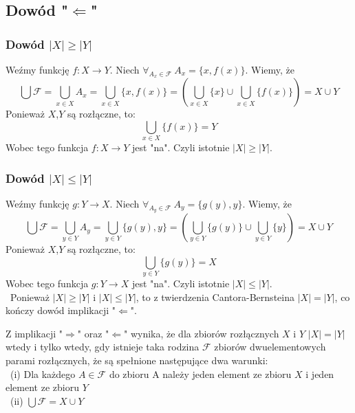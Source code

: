 \documentclass{article}
\begin{document}
\subsection*{Dowód "$\Leftarrow$"}
\subsubsection*{Dowód $|X|\geq |Y|$}
Weźmy funkcję $f: X \rightarrow Y$. Niech $\forall_{A_x \in \mathcal{F}} \ A_x = \{x,f(x)\}$. Wiemy, że \[\bigcup \mathcal{F} = \bigcup_{x \in X} A_x = \bigcup_{x\in X} \{x,f(x)\} =  (\bigcup_{x\in X} \{x\} \cup \bigcup_{x\in X} \{f(x)\}) = X \cup Y\]
Ponieważ $X$,$Y$ są rozłączne, to: \[\bigcup_{x\in X} \{f(x)\} = Y\]
Wobec tego funkcja $f: X \rightarrow Y$ jest "na". Czyli istotnie $|X|\geq |Y|$.

\subsubsection*{Dowód $|X|\leq |Y|$}
Weźmy funkcję $g: Y \rightarrow X$. Niech $\forall_{A_y \in \mathcal{F}} \ A_y = \{g(y),y\}$. Wiemy, że \[\bigcup \mathcal{F} = \bigcup_{y \in Y} A_y = \bigcup_{y\in Y} \{g(y),y\} =  (\bigcup_{y\in Y} \{g(y)\} \cup \bigcup_{y\in Y} \{y\}) = X \cup Y\]
Ponieważ $X$,$Y$ są rozłączne, to: \[\bigcup_{y\in Y} \{g(y)\} = X\]
Wobec tego funkcja $g: Y \rightarrow X$ jest "na". Czyli istotnie $|X|\leq |Y|$. \\\
Ponieważ $|X|\geq |Y|$ i $|X|\leq |Y|$, to z twierdzenia Cantora-Bernsteina $|X| = |Y|$, co kończy dowód implikacji "$\Leftarrow$".

Z implikacji  "$\Rightarrow$" oraz "$\Leftarrow$" wynika, że  dla zbiorów rozłącznych $X$ i $Y$  $|X| = |Y |$ wtedy i tylko wtedy,
gdy istnieje taka rodzina $\mathcal{F}$ zbiorów dwuelementowych parami rozłącznych, że są spełnione następujące
dwa warunki:
\\\
(i) Dla każdego $A \in  \mathcal{F}$ do zbioru A należy jeden element ze zbioru $X$ i jeden element ze zbioru $Y$ 
\\\
(ii) 
$\bigcup \mathcal{F} = X \cup Y$
\end{document}

